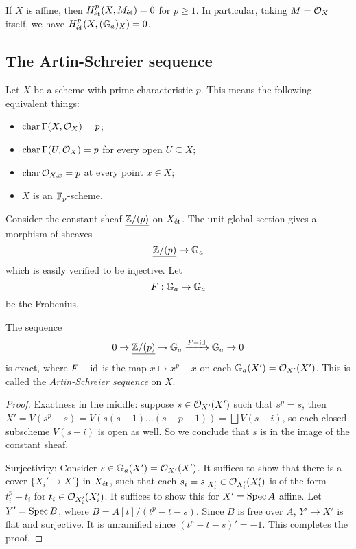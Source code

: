 \documentclass[11pt]{amsart}
\begin{document}
\begin{cor}
    If $X$ is affine, then $H^p_{\operatorname{\acute{e}t}}(X, M_{\operatorname{\acute{e}t}}) = 0$ for $p\ge 1$. In particular, taking $M = \mathcal{O}_X$ itself, we have $H^p_{\operatorname{\acute{e}t}}(X, (\mathbb{G}_a)_X) = 0$.
\end{cor}



\subsection{The Artin-Schreier sequence}

Let $X$ be a scheme with prime characteristic $p$. This means the following equivalent things:
\begin{itemize}
    \item $\operatorname{char} \Gamma(X, \mathcal{O}_X) = p$;
    \item $\operatorname{char} \Gamma(U, \mathcal{O}_X) = p$ for every open $U\subseteq X$;
    \item $\operatorname{char} \mathcal{O}_{X,x} = p$ at every point $x\in X$;
    \item $X$ is an $\mathbb{F}_p$-scheme.
\end{itemize}
Consider the constant sheaf $\underline{\mathbb{Z}/(p)}$ on $X_{\operatorname{\acute{e}t}}$. The unit global section gives a morphism of sheaves
\[\underline{\mathbb{Z}/(p)} \to \mathbb{G}_a\]
which is easily verified to be injective. Let
\[F: \mathbb{G}_a\to \mathbb{G}_a\]
be the Frobenius.

\begin{thm}
    The sequence
    \[0\to \underline{\mathbb{Z}/(p)} \to \mathbb{G}_a\xrightarrow{F-\operatorname{id}} \mathbb{G}_a \to 0\]
    is exact, where $F-\operatorname{id}$ is the map $x\mapsto x^p-x$ on each $\mathbb{G}_a(X') = \mathcal{O}_{X'}(X')$. This is called the \emph{Artin-Schreier sequence} on $X$.
\end{thm}

\begin{proof}
    Exactness in the middle: suppose $s\in \mathcal{O}_{X'}(X')$ such that $s^p = s$, then $X' = V(s^p-s) = V(s(s-1)\dots(s-p+1)) = \bigsqcup V(s-i)$, so each closed subscheme $V(s-i)$ is open as well. So we conclude that $s$ is in the image of the constant sheaf.

    Surjectivity: Consider $s\in \mathbb{G}_a(X') = \mathcal{O}_{X'}(X')$. It suffices to show that there is a cover $\{X_i'\to X'\}$ in $X_{\operatorname{\acute{e}t}}$, such that each $s_i = s|_{X_i'}\in \mathcal{O}_{X_i'}(X_i')$ is of the form $t_i^p-t_i$ for $t_i\in \mathcal{O}_{X_i'}(X_i')$. It suffices to show this for $X' = \operatorname{Spec} A$ affine. Let $Y' = \operatorname{Spec} B$, where $B = A[t]/(t^p-t-s)$. Since $B$ is free over $A$, $Y'\to X'$ is flat and surjective. It is unramified since $(t^p-t-s)' = -1$. This completes the proof.
\end{proof}
\end{document}

